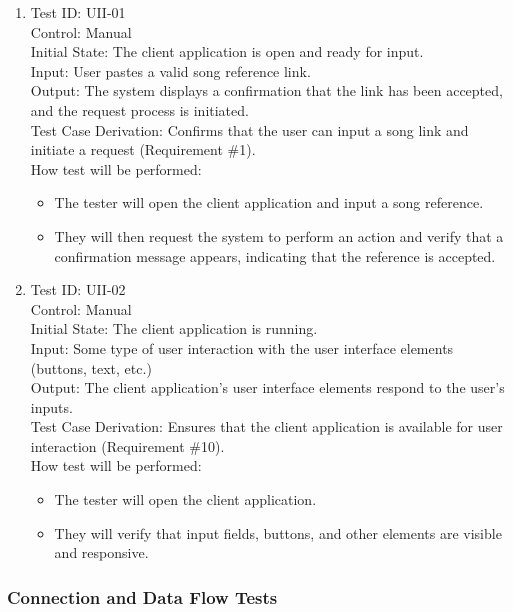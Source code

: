 \documentclass[12pt, titlepage]{article}
\begin{document}
\begin{enumerate}

\item Test ID: UII-01\\
Control: Manual\\
Initial State: The client application is open and ready for input.\\
Input: User pastes a valid song reference link.\\
Output: The system displays a confirmation that the link has been accepted, and the request process is initiated.\\
Test Case Derivation: Confirms that the user can input a song link and initiate a request (Requirement \#1).\\
How test will be performed: 
\begin{itemize}
    \item The tester will open the client application and input a song reference.
    \item They will then request the system to perform an action and verify that a confirmation message appears, indicating that the reference is accepted.
\end{itemize}

\item Test ID: UII-02\\
Control: Manual\\
Initial State: The client application is running.\\
Input: Some type of user interaction with the user interface elements (buttons, text, etc.)\\
Output: The client application’s user interface elements respond to the user’s inputs.\\
Test Case Derivation: Ensures that the client application is available for user interaction (Requirement \#10).\\
How test will be performed:
\begin{itemize}
    \item The tester will open the client application.
    \item They will verify that input fields, buttons, and other elements are visible and responsive.
\end{itemize}

\end{enumerate}

\subsubsection{Connection and Data Flow Tests}
\end{document}
